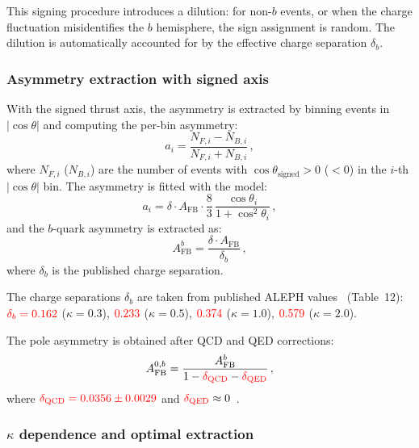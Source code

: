 \documentclass[11pt,a4paper]{article}
\newcommand{\external}[1]{\textcolor{red}{#1}}
\begin{document}
This signing procedure introduces a dilution: for non-$b$ events,
or when the charge fluctuation misidentifies the $b$ hemisphere,
the sign assignment is random.
The dilution is automatically accounted for by the effective charge
separation $\delta_b$.

\subsubsection{Asymmetry extraction with signed axis}

With the signed thrust axis, the asymmetry is extracted by binning
events in $|\cos\theta|$ and computing the per-bin asymmetry:
\begin{equation}
a_i = \frac{N_{F,i} - N_{B,i}}{N_{F,i} + N_{B,i}}\,,
\label{eq:bin_asymmetry}
\end{equation}
where $N_{F,i}$ ($N_{B,i}$) are the number of events with
$\cos\theta_\text{signed} > 0$ ($< 0$) in the $i$-th
$|\cos\theta|$ bin.
The asymmetry is fitted with the model:
\begin{equation}
a_i = \delta \cdot A_\text{FB} \cdot
  \frac{8}{3}\,\frac{\cos\theta_i}{1 + \cos^2\theta_i}\,,
\label{eq:asymmetry_fit}
\end{equation}
and the $b$-quark asymmetry is extracted as:
\begin{equation}
A_\text{FB}^b = \frac{\delta \cdot A_\text{FB}}{\delta_b}\,,
\label{eq:afb_extraction}
\end{equation}
where $\delta_b$ is the published charge separation.

The charge separations $\delta_b$ are taken from published
ALEPH values~\cite{LEP:EWWG:2005} (Table~12):
$\external{\delta_b = 0.162}$ ($\kappa = 0.3$),
$\external{0.233}$ ($\kappa = 0.5$),
$\external{0.374}$ ($\kappa = 1.0$),
$\external{0.579}$ ($\kappa = 2.0$).

The pole asymmetry is obtained after QCD and QED corrections:
\begin{equation}
A_\text{FB}^{0,b} = \frac{A_\text{FB}^b}
  {1 - \external{\delta_\text{QCD}} - \external{\delta_\text{QED}}}\,,
\label{eq:afb_pole}
\end{equation}
where $\external{\delta_\text{QCD} = 0.0356 \pm 0.0029}$ and
$\external{\delta_\text{QED}} \approx 0$~\cite{LEP:EWWG:2005}.

\subsubsection{$\kappa$ dependence and optimal extraction}
\end{document}
